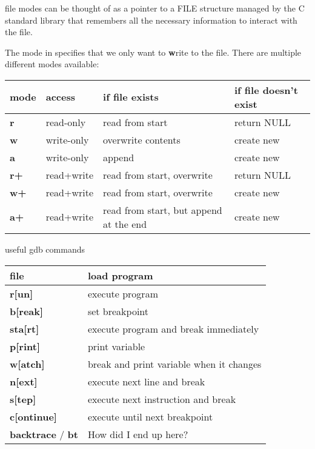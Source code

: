 \documentclass[10pt,graphics,aspectratio=169,table]{beamer}
\begin{document}
\begin{frame}{file modes}
     can be thought of as a pointer to a FILE structure managed
    by the C standard library that remembers all the necessary information
    to interact with the file. 

    The  mode in  specifies that we
    only want to \textbf{w}rite to the file.
    There are multiple different modes available: 


    \begin{tabular}{|l|l|l|l|}
        \hline 
        \textbf{mode} & \textbf{access} & \textbf{if file exists} & \textbf{if file doesn't exist}\\ \hline 
        \textbf{r} & read-only & read from start & return NULL \\\hline
        \textbf{w} & write-only & overwrite contents & create new \\\hline
        \textbf{a} & write-only & append & create new \\\hline
        \textbf{r+} & read+write & read from start, overwrite & return NULL \\\hline
        \textbf{w+} & read+write & read from start, overwrite & create new \\\hline
        \textbf{a+} & read+write & read from start, but append at the end& create new \\\hline
    \end{tabular}
\end{frame}

\begin{frame}{useful gdb commands}
    \begin{tabular}{|l|l|}
        \hline
        \textbf{file} & load program\\\hline
        \textbf{r[un]} & execute program\\\hline
        \textbf{b[reak]} & set breakpoint\\\hline
        \textbf{sta[rt]} & execute program and break immediately\\\hline
        \textbf{p[rint]} & print variable\\\hline
        \textbf{w[atch]} & break and print variable when it changes\\\hline
        \textbf{n[ext]} & execute next line and break\\\hline
        \textbf{s[tep]} & execute next instruction and break\\\hline
        \textbf{c[ontinue]} & execute until next breakpoint\\\hline
        \textbf{backtrace} / \textbf{bt} & How did I end up here?\\\hline
    \end{tabular}
\end{frame}
\end{document}
